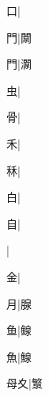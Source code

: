 \begin{multicols}{2}
{{\cjk{}{\cnsym{}　}{\cnsym{}　}口}|{}\par
{\cjk{}{\cnsym{}　}{\cnsym{}　}門}|{\cjk{}闎}\par
{門}|{\cjk{}灁}\par
{\cjk{}{\cnsym{}　}{\cnsym{}　}虫}|{}\par
{\cjk{}{\cnsym{}　}{\cnsym{}　}骨}|{}\par
{\cjk{}{\cnsym{}　}{\cnsym{}　}禾}|{}\par
{\cjk{}{\cnsym{}　}{\cnsym{}　}秝}|{}\par
{\cjk{}{\cnsym{}　}{\cnsym{}　}白}|{}\par
{\cjk{}{\cnsym{}　}{\cnsym{}　}自}|{}\par
{}|{}\par
{\cjk{}{\cnsym{}　}{\cnsym{}　}金}|{}\par
{\cjk{}{\cnsym{}　}{\cnsym{}　}月}|{\cjk{}腺}\par
{\cjk{}{\cnsym{}　}{\cnsym{}　}鱼}|{\cjk{}鳈}\par
{\cjk{}{\cnsym{}　}{\cnsym{}　}魚}|{\cjk{}鰁}\par
{母夊}|{\cjk{}瀪}\par
}
\end{multicols}
